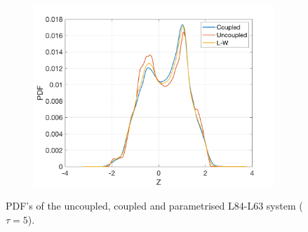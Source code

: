 \documentclass[12pt]{article}
\begin{document}
\begin{figure}[H]
\begin{subfigure}[b]{0.3\textwidth}
		\includegraphics[width=\textwidth]{plots/l84l63/pdf_z_5.png}
	\end{subfigure}
	\caption{\label{pdfucp5}PDF's of the uncoupled, coupled and parametrised L84-L63 system ($\tau=5$).}
\end{figure}
\end{document}
